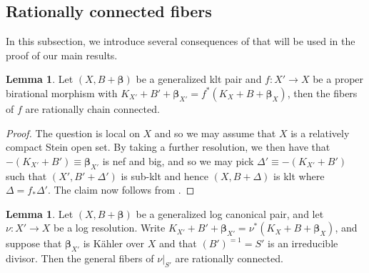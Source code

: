 \documentclass[11pt]{amsart}
\numberwithin{equation}{section}
\def\bbeta{\boldsymbol{\beta}}
\theoremstyle{definition}
\theoremstyle{definition}
\newtheorem{lemma}[theorem]{Lemma}
\theoremstyle{definition}
\begin{document}
\subsection{Rationally connected fibers} In this subsection, we introduce several consequences of \cite{HM07} that will be used in the proof of our main results.
\begin{lemma}\label{l-kltrcc} Let $(X,B+\bbeta)$ be a generalized klt pair and $f:X'\to X$ be a proper birational morphism with $K_{X'}+B'+\bbeta_{X'} = f^*(K_X+B+\bbeta_X)$, then the fibers of $f$ are rationally chain connected.\end{lemma}
\begin{proof} 
The question is local on $X$ and so we may assume that $X$ is a relatively compact Stein open set.
By taking a further resolution, we then have that $-(K_{X'} + B') \equiv \bbeta_{X'}$ is nef and big, and so we may pick $\Delta' \equiv -(K_{X'}+B')$ such that $(X',B'+\Delta')$ is sub-klt and hence $(X,B+\Delta)$ is klt where $\Delta=f_*\Delta '$. The claim now follows from \cite[Corollary 1.5]{HM07}.
\end{proof}
\begin{lemma}\label{l-pltrcc} Let $(X,B+\bbeta)$ be a generalized log canonical pair, and let
$\nu:X'\to X$ be a log resolution. Write
$K_{X'}+B'+\bbeta_{X'}=\nu^*(K_X+B+\bbeta_X)$, and suppose that
$\bbeta_{X'}$ is K\"ahler over $X$ and that $(B')^{=1}=S'$ is an
irreducible divisor. Then the general fibers of $\nu|_{S'}$ are
rationally connected.
\end{lemma}
\end{document}
